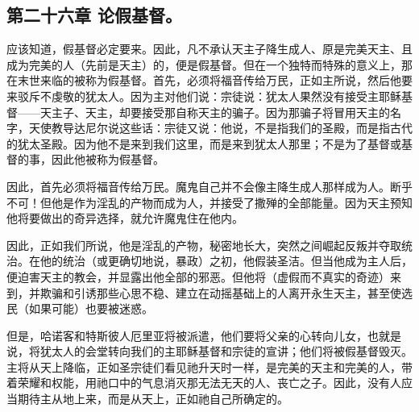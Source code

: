
\subsection{第二十六章 论假基督。}

应该知道，假基督必定要来。因此，凡不承认天主子降生成人、原是完美天主、且成为完美的人（先前是天主）的，便是假基督。但在一个独特而特殊的意义上，那在末世来临的被称为假基督。首先，必须将福音传给万民，正如主所说，然后他要来驳斥不虔敬的犹太人。因为主对他们说：宗徒说：犹太人果然没有接受主耶稣基督——天主子、天主，却要接受那自称天主的骗子。因为那骗子将冒用天主的名字，天使教导达尼尔说这些话：宗徒又说：他说，不是指我们的圣殿，而是指古代的犹太圣殿。因为他不是来到我们这里，而是来到犹太人那里；不是为了基督或基督的事，因此他被称为假基督。\par

因此，首先必须将福音传给万民。魔鬼自己并不会像主降生成人那样成为人。断乎不可！但他是作为淫乱的产物而成为人，并接受了撒殚的全部能量。因为天主预知他将要做出的奇异选择，就允许魔鬼住在他内。\par

因此，正如我们所说，他是淫乱的产物，秘密地长大，突然之间崛起反叛并夺取统治。在他的统治（或更确切地说，暴政）之初，他假装圣洁。但当他成为主人后，便迫害天主的教会，并显露出他全部的邪恶。但他将（虚假而不真实的奇迹）来到，并欺骗和引诱那些心思不稳、建立在动摇基础上的人离开永生天主，甚至使选民（如果可能）也要被迷惑。\par

但是，哈诺客和特斯彼人厄里亚将被派遣，他们要将父亲的心转向儿女，也就是说，将犹太人的会堂转向我们的主耶稣基督和宗徒的宣讲；他们将被假基督毁灭。主将从天上降临，正如圣宗徒们看见祂升天时一样，是完美的天主和完美的人，带着荣耀和权能，用祂口中的气息消灭那无法无天的人、丧亡之子。因此，没有人应当期待主从地上来，而是从天上，正如祂自己所确定的。\par

